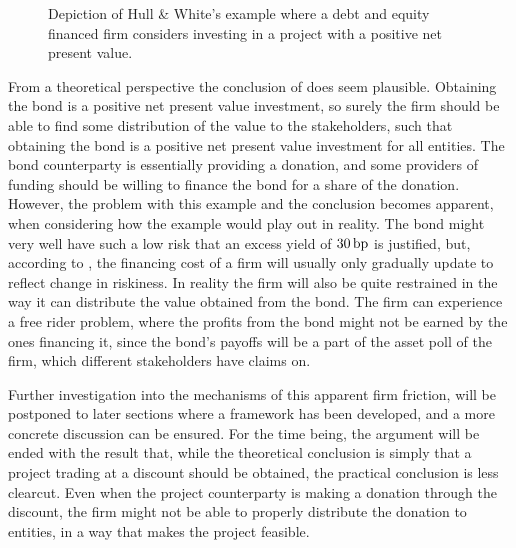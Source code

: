 \documentclass[main.tex]{subfiles}
\begin{document}
            \begin{figure}
                \centering
                \resizebox{10cm}{!}{%
                \begin{tikzpicture}
                    
                \end{tikzpicture}        
                }   
                \caption{
                    Depiction of Hull \& White's example where a debt and equity financed firm
                    considers investing in a project with a positive net present value.
                }
                \label{fig:hw-example}
            \end{figure}
            
            From a theoretical perspective the conclusion of \textcite{HullWhite2012FVA} does seem plausible. 
            Obtaining the bond is a positive net present value investment, 
            so surely the firm should be able to find some distribution of the value to the stakeholders, 
            such that obtaining the bond is a positive net present value investment for all entities.
            The bond counterparty is essentially providing a donation, 
            and some providers of funding should be willing to finance the bond for a share of the donation.
            However, the problem with this example and the conclusion becomes apparent,
            when considering how the example would play out in reality. 
            The bond might very well have such a low risk that an excess yield of $30\,\text{bp}$ is justified, 
            but, according to \textcite[Section 3]{Castagna2012FVA}, 
            the financing cost of a firm will usually only gradually update to reflect change in riskiness.
            In reality the firm will also be quite restrained 
            in the way it can distribute the value obtained from the bond.
            The firm can experience a free rider problem, 
            where the profits from the bond might not be earned by the ones financing it,
            since the bond's payoffs will be a part of the asset poll of the firm,
            which different stakeholders have claims on.

            Further investigation into the mechanisms of this apparent firm friction,
            will be postponed to later sections where a framework has been developed,
            and a more concrete discussion can be ensured.  
            For the time being, the argument will be ended with the result that, 
            while the theoretical conclusion is simply that a project trading at a discount should be obtained,
            the practical conclusion is less clearcut.
            Even when the project counterparty is making a donation through the discount,
            the firm might not be able to properly distribute the donation to entities,
            in a way that makes the project feasible.
\end{document}
